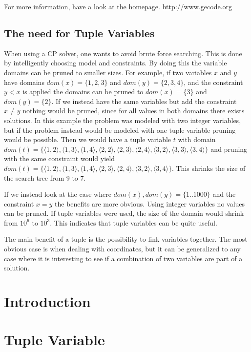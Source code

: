 \documentclass[a4paper,11pt]{article}
\begin{document}
For more information, have a look at the homepage. \url{http://www.gecode.org}

\subsection{The need for Tuple Variables}
When using a CP solver, one wants to avoid brute force searching. This is done by intelligently choosing model and constraints. By doing this the variable domains can be pruned to smaller sizes. For example, if two variables $x$ and $y$ have domains $dom(x)=\{1,2,3\}$ and $dom(y)=\{2,3,4\}$, and the constraint $y<x$ is applied the domains can be pruned to $dom(x)=\{3\}$ and $dom(y)=\{2\}$. If we instead have the same variables but add the constraint $x\neq y$ nothing would be pruned, since for all values in both domains there exists solutions. In this example the problem was modeled with two integer variables, but if the problem instead would be modeled with one tuple variable pruning would be possible. Then we would have a tuple variable $t$ with domain $dom(t)=\{\langle1,2\rangle,\langle1,3\rangle,\langle1,4\rangle,\langle2,2\rangle,\langle2,3\rangle,\langle2,4\rangle,\langle3,2\rangle,\langle3,3\rangle,\langle3,4\rangle\}$ and pruning with the same constraint would yield $dom(t)=\{\langle1,2\rangle,\langle1,3\rangle,\langle1,4\rangle,\langle2,3\rangle,\langle2,4\rangle,\langle3,2\rangle,\langle3,4\rangle\}$. This shrinks the size of the search tree from 9 to 7. 

If we instead look at the case where $dom(x),dom(y)=\{1..1000\}$ and the constraint $x=y$ the benefits are more obvious. Using integer variables no values can be pruned. If tuple variables were used, the size of the domain would shrink from $10^6$ to $10^3$. This indicates that tuple variables can be quite useful.

The main benefit of a tuple is the possibility to link variables together. The most obvious case is when dealing with coordinates, but it can be generalized to any case where it is interesting to see if a combination of two variables are part of a solution.

\section{Introduction}

\section{Tuple Variable}
\end{document}

